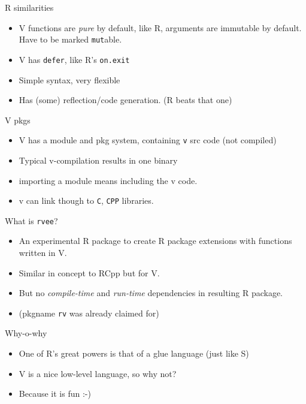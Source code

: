 \documentclass[
  ignorenonframetext,
]{beamer}
\providecommand{\tightlist}{%
  \setlength{\itemsep}{0pt}\setlength{\parskip}{0pt}}
\begin{document}
\begin{frame}[fragile]{R similarities}
\protect\hypertarget{r-similarities}{}
\begin{itemize}
\tightlist
\item
  V functions are \emph{pure} by default, like R, arguments are
  immutable by default. Have to be marked \texttt{mut}able.
\item
  V has \texttt{defer}, like R's \texttt{on.exit}
\item
  Simple syntax, very flexible
\item
  Has (some) reflection/code generation. (R beats that one)
\end{itemize}
\end{frame}

\begin{frame}[fragile]{V pkgs}
\protect\hypertarget{v-pkgs}{}
\begin{itemize}
\tightlist
\item
  V has a module and pkg system, containing \texttt{v} src code (not
  compiled)
\item
  Typical v-compilation results in one binary
\item
  importing a module means including the v code.
\item
  v can link though to \texttt{C}, \texttt{CPP} libraries.
\end{itemize}
\end{frame}

\begin{frame}[fragile]{What is \texttt{rvee}?}
\protect\hypertarget{what-is-rvee}{}
\begin{itemize}
\tightlist
\item
  An experimental R package to create R package extensions with
  functions written in V.
\item
  Similar in concept to RCpp but for V.
\item
  But no \emph{compile-time} and \emph{run-time} dependencies in
  resulting R package.
\item
  (pkgname \texttt{rv} was already claimed for)
\end{itemize}

\begin{block}{Why-o-why}
\protect\hypertarget{why-o-why}{}
\begin{itemize}
\tightlist
\item
  One of R's great powers is that of a glue language (just like S)
\item
  V is a nice low-level language, so why not?
\item
  Because it is fun :-)
\end{itemize}
\end{block}
\end{frame}
\end{document}
